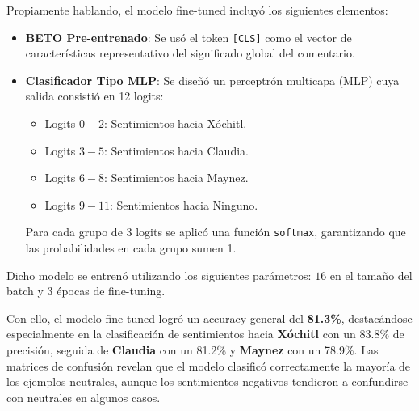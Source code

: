 \documentclass[10pt, a4paper]{article}
\begin{document}
	Propiamente hablando, el modelo fine-tuned incluyó los siguientes elementos:
	\begin{itemize}
		\item \textbf{BETO Pre-entrenado}: Se usó el token \texttt{[CLS]} como el vector de características representativo del significado global del comentario.
		\item \textbf{Clasificador Tipo MLP}: Se diseñó un perceptrón multicapa (MLP) cuya salida consistió en 12 logits:
		\begin{itemize}
			\item Logits \(0-2\): Sentimientos hacia Xóchitl.
			\item Logits \(3-5\): Sentimientos hacia Claudia.
			\item Logits \(6-8\): Sentimientos hacia Maynez.
			\item Logits \(9-11\): Sentimientos hacia Ninguno.
		\end{itemize}
		Para cada grupo de 3 logits se aplicó una función \texttt{softmax}, garantizando que las probabilidades en cada grupo sumen 1.
	\end{itemize}
	
	Dicho modelo se entrenó utilizando los siguientes parámetros: \(16\) en el tamaño del batch y \(3\) épocas de fine-tuning. 
	
	Con ello, el modelo fine-tuned logró un accuracy general del \textbf{81.3\%}, destacándose especialmente en la clasificación de sentimientos hacia \textbf{Xóchitl} con un 83.8\% de precisión, seguida de \textbf{Claudia} con un 81.2\% y \textbf{Maynez} con un 78.9\%. Las matrices de confusión revelan que el modelo clasificó correctamente la mayoría de los ejemplos neutrales, aunque los sentimientos negativos tendieron a confundirse con neutrales en algunos casos.
	
\end{document}
